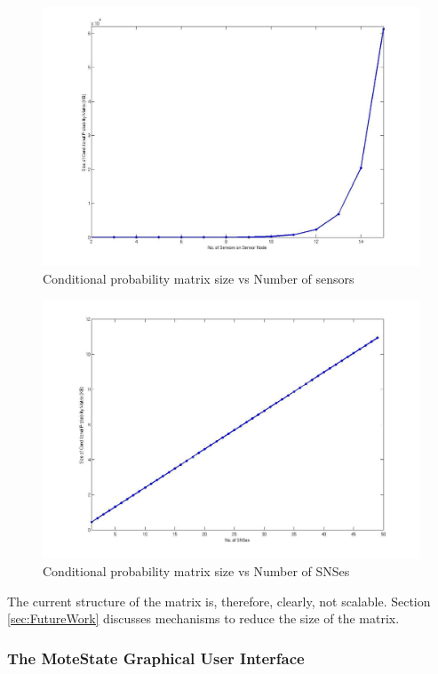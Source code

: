 \documentclass{sig-alternate-10pt}
\begin{document}
\begin{figure}[h]
\centering
\includegraphics[scale=0.2]{img/SensorVsSize.jpg}
\caption{Conditional probability matrix size vs Number of sensors} 
\label{Fig11:SensorsvsSize}
\end{figure} 
\begin{figure}[h]
\centering
\includegraphics[scale=0.2]{img/SNSVsSize.jpg}
\caption{Conditional probability matrix size vs Number of SNSes} 
\label{Fig10:SNSvsSize}
\end{figure} 


The current structure of the matrix is, therefore, clearly, not scalable. Section \ref{sec:FutureWork} discusses mechanisms to reduce the size of the matrix.


\subsubsection{The MoteState Graphical User Interface}
\end{document}
